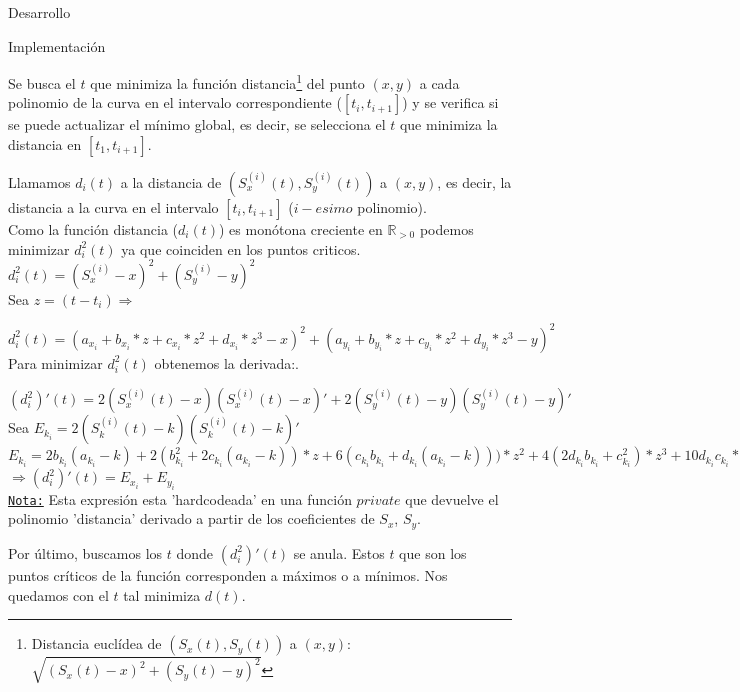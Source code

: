 \begin{section}{Desarrollo}
\begin{subsection}{Implementación}
\begin{itemize}
				Se busca el $t$ que minimiza la función distancia\footnote{Distancia euclídea de $(S_x(t),S_y(t))$ a $(x,y)$: $\sqrt{(S_x(t)-x)^2+(S_y(t)-y)^2}$} del punto $(x,y)$ a cada polinomio de la curva en el intervalo correspondiente ($[t_i,t_{i+1}]$) y se verifica si se puede actualizar el mínimo global, es decir, se selecciona el $t$ que minimiza la distancia en $[t_1,t_{i+1}]$.
				
				Llamamos $d_i(t)$ a la distancia de $(S_x^{(i)}(t),S_y^{(i)}(t))$ a $(x,y)$, es decir, la distancia a la curva en el intervalo $[t_i,t_{i+1}]$ ($i-esimo$ polinomio).\\
				
				Como la función distancia ($d_i(t)$) es monótona creciente en $\mathbb{R}_{>0}$ podemos minimizar $d_i^2(t)$ ya que coinciden en los puntos criticos.\\
				
				$d_i^2(t) = (S_x^{(i)}-x)^2+(S_y^{(i)}-y)^2$\\
				
				Sea $z=(t-t_i) \Rightarrow$
				
				$d_i^2(t) = (a_{x_i} + b_{x_i}*z + c_{x_i}*z^2 + d_{x_i}*z^3 - x)^2 + (a_{y_i} + b_{y_i}*z + c_{y_i}*z^2 + d_{y_i}*z^3 -y)^2$\\
				
				Para minimizar $d_i^2(t)$ obtenemos la derivada:.
				
				$(d_i^2)'(t) = 2(S_x^{(i)}(t)-x)(S_x^{(i)}(t)-x)'+2(S_y^{(i)}(t)-y)(S_y^{(i)}(t)-y)'$\\
				
				Sea $E_{k_i} = 2(S_k^{(i)}(t)-k)(S_k^{(i)}(t)-k)'$ \\
				
				$E_{k_i} = 2b_{k_i}(a_{k_i}-k)+2(b_{k_i}^2+2c_{k_i}(a_{k_i}-k))*z+6(c_{k_i}b_{k_i}+d_{k_i}(a_{k_i}-k)))*z^2+4(2d_{k_i}b_{k_i}+c_{k_i}^2)*z^3+10d_{k_i}c_{k_i}*z^4+6d_{k_i}^2*z^5$\\
				
				$\Rightarrow (d_i^2)'(t) = E_{x_i} + E_{y_i}$\\
				
				\underline{\texttt{Nota:}} Esta expresión esta 'hardcodeada' en una función $private$ que devuelve el polinomio 'distancia' derivado a partir de los coeficientes de $S_x$, $S_y$.
				
				Por último, buscamos los $t$ donde $(d_i^2)'(t)$ se anula. Estos $t$ que son los puntos críticos de la función corresponden a máximos o a mínimos.
				Nos quedamos con el $t$ tal minimiza $d(t)$.
				

\end{itemize}
\end{subsection}
\end{section}
